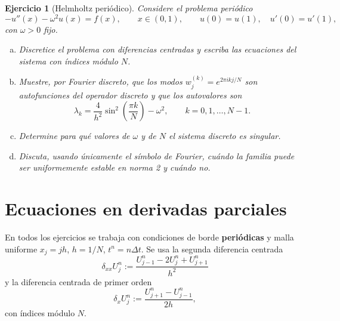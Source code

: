 \documentclass[12pt]{article}
\newtheorem{exercise}{Ejercicio}
\def\dt{\Delta t}
\begin{document}
\begin{exercise}[Helmholtz periódico]
Considere el problema periódico
\[
  -u''(x)-\omega^2 u(x)=f(x),\qquad x\in(0,1),\qquad u(0)=u(1),\quad u'(0)=u'(1),
\]
con $\omega>0$ fijo.
\begin{enumerate}[(a)]
\item Discretice el problema con diferencias centradas y escriba las ecuaciones del sistema con índices módulo $N$.
\item Muestre, por Fourier discreto, que los modos $w_j^{(k)}=e^{2\pi i kj/N}$ son autofunciones del operador discreto y que los autovalores son
\[
  \lambda_k=\frac{4}{h^2}\sin^2\!\left(\frac{\pi k}{N}\right)-\omega^2,
  \qquad k=0,1,\dots,N-1.
\]
\item Determine para qué valores de $\omega$ y de $N$ el sistema discreto es singular.
\item Discuta, usando únicamente el símbolo de Fourier, cuándo la familia puede ser uniformemente estable en norma 2 y cuándo no.
\end{enumerate}
\end{exercise}

\section*{Ecuaciones en derivadas parciales}

En todos los ejercicios se trabaja con condiciones de borde \textbf{periódicas} y malla uniforme $x_j=jh$, $h=1/N$, $t^n=n\dt$. Se usa la segunda diferencia centrada
\[
  \delta_{xx}U_j^n := \frac{U_{j-1}^n - 2U_j^n + U_{j+1}^n}{h^2}
\]
y la diferencia centrada de primer orden
\[
  \delta_x U_j^n := \frac{U_{j+1}^n - U_{j-1}^n}{2h},
\]
con índices módulo $N$.
\end{document}
